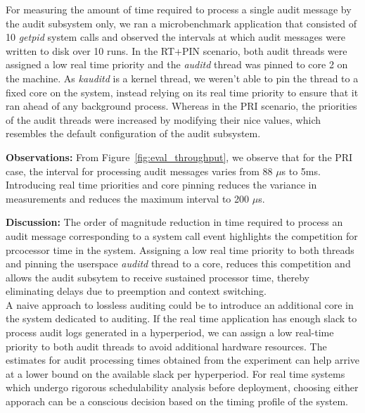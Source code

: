 For measuring the amount of time required to process a single audit message by the audit subsystem only, we ran a microbenchmark application that consisted of 10 \textit{getpid} system calls and observed the intervals at which audit messages were written to disk over 10 runs. In the RT+PIN scenario, both audit threads were assigned a low real time priority and the \textit{auditd} thread was pinned to core 2 on the machine. As \textit{kauditd} is a kernel thread, we weren't able to pin the thread to a fixed core on the system, instead relying on its real time priority to ensure that it ran ahead of any background process. Whereas in the PRI scenario, the priorities of the audit threads were increased by modifying their nice values, which resembles the default configuration of the audit subsystem.

\textbf{Observations:} From Figure~\ref{fig:eval_throughput}, we observe that for the PRI case, the interval for processing audit messages varies from 88 $\mu$s to 5ms. Introducing real time priorities and core pinning reduces the variance in measurements and reduces the maximum interval to 200 $\mu$s.

\textbf{Discussion:} %
The order of magnitude reduction in time required to process an audit message corresponding to a system call event highlights the competition for prcocessor time in the system. Assigning a low real time priority to both threads and pinning the userspace \textit{auditd} thread to a core, reduces this competition and allows the audit subsytem to receive sustained processor time, thereby eliminating delays due to preemption and context switching.\\
A naive approach to lossless auditing could be to introduce an additional core in the system dedicated to auditing. If the real time application has enough slack to process audit logs generated in a hyperperiod, we can assign a low real-time priority to both audit threads to avoid additional hardware resources. The estimates for audit processing times obtained from the experiment can help arrive at a lower bound on the available slack per hyperperiod. For real time systems which undergo rigorous schedulability analysis before deployment, choosing either apporach can be a conscious decision based on the timing profile of the system.


